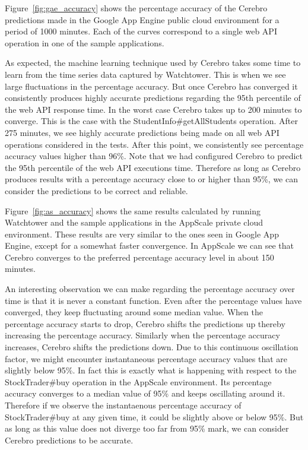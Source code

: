 Figure~\ref{fig:gae_accuracy} shows the percentage accuracy of the Cerebro predictions made in the Google App Engine 
public cloud environment for a period of 1000 minutes. Each of the curves correspond to a single web API operation in one of the 
sample applications. 

As expected, the machine learning technique used by Cerebro takes some time to learn
from the time series data captured by Watchtower. This is when we see large fluctuations in the percentage accuracy. But
once Cerebro has converged it consistently produces highly accurate predictions regarding the 95th percentile of the web API
response time. In the worst case Cerebro takes up to 200 minutes to converge. This is the case with the
StudentInfo\#getAllStudents operation. After 275 minutes, we see highly accurate predictions being made on all web API
operations considered in the tests. After this point, we consistently see percentage accuracy values higher than 96\%. Note that
we had configured Cerebro to predict the 95th percentile of the web API executions time. Therefore as long as Cerebro produces
results with a percentage accuracy close to or higher than 95\%, we can consider the predictions to be correct and reliable.

Figure~\ref{fig:as_accuracy} shows the same results calculated by running Watchtower and the sample applications in the AppScale private cloud
environment. These results are very similar to the ones seen in Google App Engine, except for a somewhat faster convergence. In AppScale
we can see that Cerebro converges to the preferred percentage accuracy level in about 150 minutes.

An interesting observation we can make regarding the percentage accuracy over time is that it is never a constant function. 
Even after the percentage values have converged, they keep fluctuating 
around some median value. When the percentage accuracy starts to drop, Cerebro shifts the predictions up thereby increasing
the percentage accuracy. Similarly when the percentage accuracy increases, Cerebro shifts the predictions down. Due to this
continuous oscillation factor, we might encounter instantaneous percentage accuracy values that are slightly below 95\%. In fact this is exactly what is
happening with respect to the StockTrader\#buy operation in the AppScale environment. Its percentage accuracy converges to a median
value of 95\% and keeps oscillating around it. Therefore if we observe the instantaenous percentage accuracy of StockTrader\#buy at any given time, it
could be slightly above or below 95\%. But as long as this value does not diverge too far from 95\% mark, we can consider Cerebro predictions to
be accurate.

